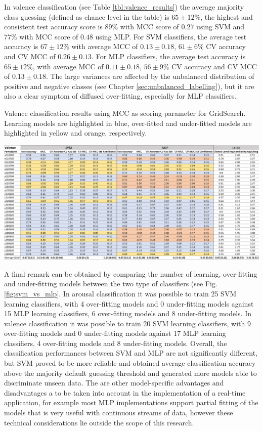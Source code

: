 In valence classification (see Table \ref{tbl:valence_results}) the average majority class guessing (defined as chance level in the table) is \(65\pm12\%\), the highest and consistent test accuracy score is \(89\%\) with \ac{MCC} score of \(0.27\) using \ac{SVM} and \(77\%\) with \ac{MCC} score of \(0.48\) using \ac{MLP}. For \ac{SVM} classifiers, the average test accuracy is \( 67\pm12\%\) with average MCC of \(0.13\pm0.18\), \(61\pm6\% \) \ac{CV} accuracy and \ac{CV MCC} of \(0.26\pm0.13.\) For \ac{MLP} classifiers, the average test accuracy is \(65\pm12\%\), with average MCC of \(0.11\pm0.18\), \(56\pm9\% \) \ac{CV} accuracy and \ac{CV MCC} of \(0.13\pm0.18\). The large variances are affected by the unbalanced distribution of positive and negative classes (see Chapter \ref{sec:unbalanced_labelling}), but it are also a clear symptom of diffused over-fitting, especially for \ac{MLP} classifiers. 

\begin{table}[h!]
  \caption{Valence classification results using MCC as scoring parameter for GridSearch. Learning models are highlighted in blue, over-fitted and under-fitted models are highlighted in yellow and orange, respectively.}
  \label{tbl:valence_results}
  \includegraphics[width=\linewidth]{img/results/valence_results.png}
\end{table}

A final remark can be obtained by comparing the number of learning, over-fitting and under-fitting models between the two type of classifiers (see Fig. \ref{fig:svm_vs_mlp}. In arousal classification it was possible to train 25 \ac{SVM} learning classifiers, with 4 over-fitting models and 0 under-fitting models against 15 \ac{MLP} learning classifiers, 6 over-fitting models and 8 under-fitting models. In valence classification it was possible to train 20 \ac{SVM} learning classifiers, with 9 over-fitting models and 0 under-fitting models against 17 \ac{MLP} learning classifiers, 4 over-fitting models and 8 under-fitting models. 
Overall, the classification performances between \ac{SVM} and \ac{MLP} are not significantly different, but \ac{SVM} proved to be more reliable and obtained average classification accuracy above the majority default guessing threshold and generated more models able to discriminate unseen data. The are other model-specific advantages and disadvantages a to be taken into account in the implementation of a real-time application, for example most \ac{MLP} implementations support partial fitting of the models that is very useful with continuous streams of data, however these technical considerations lie outside the scope of this research.

